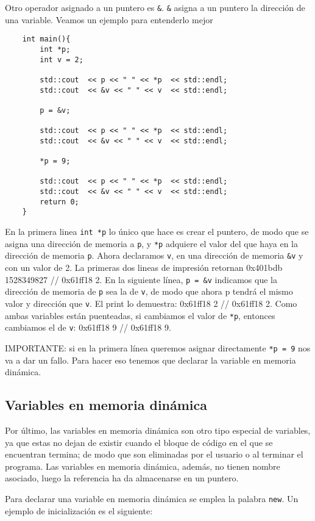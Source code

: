 \documentclass[a4paper]{article}
\begin{document}
	Otro operador asignado a un puntero es \verb|&|. \verb|&| asigna a un puntero la dirección de una variable. Veamos un ejemplo para entenderlo mejor
	\begin{lstlisting}
	int main(){
	    int *p;
		int v = 2;
		
		std::cout  << p << " " << *p  << std::endl;
		std::cout  << &v << " " << v  << std::endl;
		
		p = &v;
		
		std::cout  << p << " " << *p  << std::endl;
		std::cout  << &v << " " << v  << std::endl;
		
		*p = 9;
		
		std::cout  << p << " " << *p  << std::endl;
		std::cout  << &v << " " << v  << std::endl;
		return 0;
	}
	\end{lstlisting}
	En la primera linea \verb!int *p! lo único que hace es crear el puntero, de modo que se asigna una dirección de memoria a \verb|p|, y \verb|*p| adquiere el valor del que haya en la dirección de memoria \verb|p|.
	Ahora declaramos \verb|v|, en una dirección de memoria \verb|&v| y con un valor de 2. La primeras dos lineas de impresión retornan 0x401bdb 1528349827 // 0x61ff18 2. En la siguiente línea, \verb|p = &v| indicamos que la dirección de memoria de \verb|p| sea la de \verb|v|, de modo que ahora p tendrá el mismo valor y dirección que \verb|v|. El print lo demuestra: 0x61ff18 2 // 0x61ff18 2. 
	Como ambas variables están puenteadas, si cambiamos el valor de \verb|*p|, entonces cambiamos el de \verb|v|: 0x61ff18 9 // 0x61ff18 9.
	
	IMPORTANTE: si en la primera línea queremos asignar directamente \verb|*p = 9| nos va a dar un fallo. Para hacer eso tenemos que declarar la variable en memoria dinámica.
	
	\subsection{Variables en memoria dinámica}
	Por último, las variables en memoria dinámica son otro tipo especial de variables, ya que estas no dejan de existir cuando el bloque de código en el que se encuentran termina; de modo que son eliminadas por el usuario o al terminar el programa. Las variables en memoria dinámica, además, no tienen nombre asociado, luego la referencia ha da almacenarse en un puntero.
	
	Para declarar una variable en memoria dinámica se emplea la palabra \verb|new|. Un ejemplo de inicialización es el siguiente:
	
\end{document}
